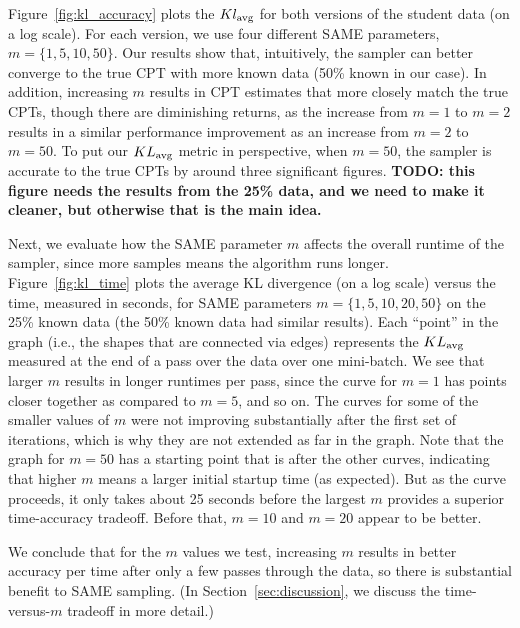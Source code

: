 \documentclass{article} %
\begin{document}
Figure~\ref{fig:kl_accuracy} plots the $Kl_{\rm avg}$ for both versions of the student data (on a log
scale). For each version, we use four different SAME parameters, $m = \{1,5,10,50\}$. Our results
show that, intuitively, the sampler can better converge to the true CPT with more known data (50\%
known in our case). In addition, increasing $m$ results in CPT estimates that more closely match the
true CPTs, though there are diminishing returns, as the increase from $m=1$ to $m=2$ results in a
similar performance improvement as an increase from $m=2$ to $m=50$. To put our $KL_{\rm avg}$
metric in perspective, when $m=50$, the sampler is accurate to the true CPTs by around three
significant figures. \textbf{TODO: this figure needs the results from the 25\% data, and we need to
make it cleaner, but otherwise that is the main idea.}

Next, we evaluate how the SAME parameter $m$ affects the overall runtime of the sampler, since more
samples means the algorithm runs longer.  Figure~\ref{fig:kl_time} plots the average KL divergence
(on a log scale) versus the time, measured in seconds, for SAME parameters $m = \{1,5,10,20,50\}$ on
the 25\% known data (the 50\% known data had similar results). Each ``point'' in the graph (i.e.,
the shapes that are connected via edges) represents the $KL_{\rm avg}$ measured at the end of a pass
over the data over one mini-batch. We see that larger $m$ results in longer runtimes per pass, since
the curve for $m=1$ has points closer together as compared to $m=5$, and so on. The curves for some
of the smaller values of $m$ were not improving substantially after the first set of iterations,
which is why they are not extended as far in the graph. Note that the graph for $m=50$ has a
starting point that is after the other curves, indicating that higher $m$ means a larger initial
startup time (as expected). But as the curve proceeds, it only takes about 25 seconds before the
largest $m$ provides a superior time-accuracy tradeoff. Before that, $m=10$ and $m=20$ appear to be
better.

We conclude that for the $m$ values we test, increasing $m$ results in better accuracy per time
after only a few passes through the data, so there is substantial benefit to SAME sampling. (In
Section~\ref{sec:discussion}, we discuss the time-versus-$m$ tradeoff in more detail.)
\end{document}
